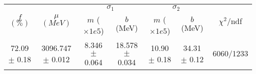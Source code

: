 \begin{tabular}{c|c|cc|cc||c}
 \multirow{2}{*}{$f$ $(\%)$} & \multirow{2}{*}{$\mu$ $(MeV)$} & \multicolumn{2}{|c|}{$\sigma_1$} & \multicolumn{2}{|c||}{$\sigma_2$} & \multirow{2}{*}{$\chi^2/$ndf} \\
 & & $m$ ($\times1e5$) & $b$ (MeV) & $m$ ($\times1e5$) & $b$ (MeV) & \\
\hline
72.09 $\pm$ 0.18 & 3096.747 $\pm$ 0.012 & 8.346 $\pm$ 0.064 & 18.578 $\pm$ 0.034 & 10.90 $\pm$ 0.18 & 34.31 $\pm$ 0.12 & 6060/1233\\
\end{tabular}
